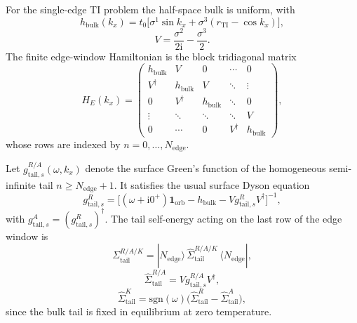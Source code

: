 \documentclass[11pt]{article}
\newcommand{\ii}{\mathrm{i}}
\newcommand{\sgn}{\mathrm{sgn}}
\newcommand{\Id}{\mathbf{1}}
\newcommand{\TI}{\mathrm{TI}}
\begin{document}
For the single-edge TI problem the half-space bulk is uniform, with
\begin{equation}
  h_{\mathrm{bulk}}(k_x)
  =
  t_0\Big[
    \sigma^1\sin k_x
    + \sigma^3(r_{\TI}-\cos k_x)
  \Big],
\end{equation}
\begin{equation}
  V=\frac{\sigma^2}{2\ii}-\frac{\sigma^3}{2}.
\end{equation}
The finite edge-window Hamiltonian is the block tridiagonal matrix
\begin{equation}
  H_E(k_x)=
  \begin{pmatrix}
    h_{\mathrm{bulk}} & V & 0 & \cdots & 0\\
    V^\dagger & h_{\mathrm{bulk}} & V & \ddots & \vdots\\
    0 & V^\dagger & h_{\mathrm{bulk}} & \ddots & 0\\
    \vdots & \ddots & \ddots & \ddots & V\\
    0 & \cdots & 0 & V^\dagger & h_{\mathrm{bulk}}
  \end{pmatrix},
\end{equation}
whose rows are indexed by \(n=0,\dots,N_{\mathrm{edge}}\).

Let \(g_{\mathrm{tail},s}^{R/A}(\omega,k_x)\) denote the surface Green's
function of the homogeneous semi-infinite tail \(n\ge N_{\mathrm{edge}}+1\).
It satisfies the usual surface Dyson equation
\begin{equation}
  g_{\mathrm{tail},s}^{R}
  =
  \Big[
    (\omega+\ii 0^+)\Id_{\mathrm{orb}}
    - h_{\mathrm{bulk}}
    - V g_{\mathrm{tail},s}^{R} V^\dagger
  \Big]^{-1},
\end{equation}
with \(g_{\mathrm{tail},s}^{A}=(g_{\mathrm{tail},s}^{R})^\dagger\).  The tail
self-energy acting on the last row of the edge window is
\begin{equation}
  \Sigma_{\mathrm{tail}}^{R/A/K}
  =
  |N_{\mathrm{edge}}\rangle\,
  \hat\Sigma_{\mathrm{tail}}^{R/A/K}\,
  \langle N_{\mathrm{edge}}|,
\end{equation}
\begin{equation}
  \hat\Sigma_{\mathrm{tail}}^{R/A}
  =
  V g_{\mathrm{tail},s}^{R/A} V^\dagger,
\end{equation}
\begin{equation}
  \hat\Sigma_{\mathrm{tail}}^{K}
  =
  \sgn(\omega)\Big(
    \hat\Sigma_{\mathrm{tail}}^{R}
    -
    \hat\Sigma_{\mathrm{tail}}^{A}
  \Big),
\end{equation}
since the bulk tail is fixed in equilibrium at zero temperature.
\end{document}
